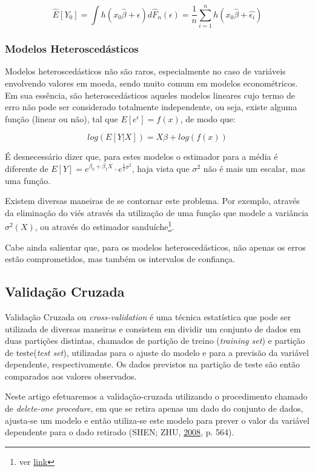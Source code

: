 \documentclass[a4paper]{article}
\let\rmarkdownfootnote\footnote%
\def\footnote{\protect\rmarkdownfootnote}
\begin{document}
\[\hat{E}[Y_0] = \int h(x_0\hat{\beta} + \epsilon)d\hat{F}_n(\epsilon) = \frac{1}{n}\sum_{i = 1}^{n}h(x_0\hat{\beta}+\hat{\epsilon_i})\]

\subsubsection{Modelos
Heteroscedásticos}\label{modelos-heteroscedasticos}

Modelos heteroscedásticos não são raros, especialmente no caso de
variáveis envolvendo valores em moeda, sendo muito comum em modelos
econométricos. Em sua essência, são heteroscedásticos aqueles modelos
lineares cujo termo de erro não pode ser considerado totalmente
independente, ou seja, existe alguma função (linear ou não), tal que
\(E[e^\epsilon] = f(x)\), de modo que:

\[log(E[Y|X]) = X\beta + log(f(x))\]

É desnecessário dizer que, para estes modelos o estimador para a média é
diferente de
\(E[Y] = e^{\beta_0 + \beta_1X} \cdot e^{\frac{1}{2}\sigma^2}\), haja
vista que \(\sigma^2\) não é mais um escalar, mas uma função.

Existem diversas maneiras de se contornar este problema. Por exemplo,
através da eliminação do viés através da utilização de uma função que
modele a variância \(\sigma^2(X)\), ou através do estimador
sanduíche\footnote{ver
  \href{https://matloff.wordpress.com/2015/09/18/can-you-say-heteroscedasticity-3-times-fast/}{link}}.

Cabe ainda salientar que, para os modelos heteroscedásticos, não apenas
os erros estão comprometidos, mas também os intervalos de confiança.

\subsection{Validação Cruzada}\label{validacao-cruzada}

Validação Cruzada ou \emph{cross-validation} é uma técnica estatística
que pode ser utilizada de diversas maneiras e consistem em dividir um
conjunto de dados em duas partições distintas, chamados de partição de
treino (\emph{training set}) e partição de teste(\emph{test set}),
utilizadas para o ajuste do modelo e para a previsão da variável
dependente, respectivamente. Os dados previstos na partição de teste são
então comparados aos valores observados.

Neste artigo efetuaremos a validação-cruzada utilizando o procedimento
chamado de \emph{delete-one procedure}, em que se retira apenas um dado
do conjunto de dados, ajusta-se um modelo e então utiliza-se este modelo
para prever o valor da variável dependente para o dado retirado (SHEN;
ZHU, \protect\hyperlink{ref-shen}{2008}, p. 564).
\end{document}
